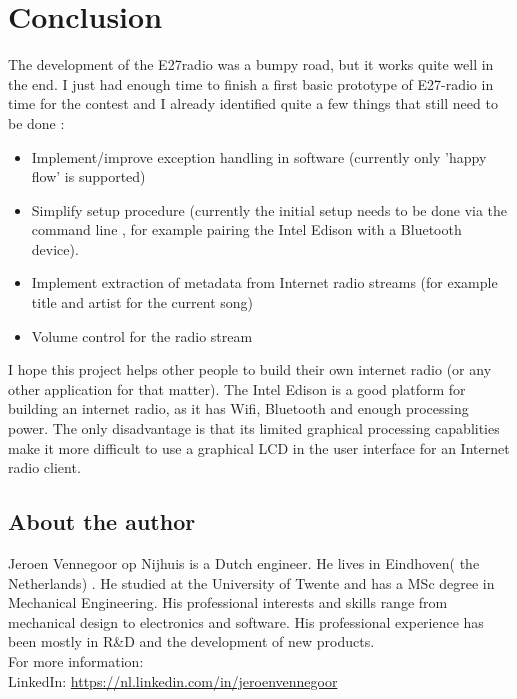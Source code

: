 \documentclass[12pt,a4paper]{scrreprt}
\begin{document}
\chapter{Conclusion}
The development of the E27radio was a bumpy road, but it works quite well in the end. I just had enough time to finish a first basic prototype of E27-radio in time for the contest and I already identified quite a few things that still need to be done :
\begin{itemize}
	\item Implement/improve exception handling in software 
	(currently only 'happy flow' is supported)
	\item Simplify setup procedure (currently the initial setup needs to be done via the command line , for example pairing the Intel Edison with a Bluetooth device).
	\item Implement extraction of metadata from Internet radio streams (for example title and artist for the current song)
	\item Volume control for the radio stream
\end{itemize}
I hope this project helps other people to build their own internet radio (or any other application for that matter). The Intel Edison is a good platform for building an internet radio, as it has Wifi, Bluetooth and enough processing power. The only disadvantage is that its limited graphical processing capablities make it more difficult to use a graphical LCD in the user interface for an Internet radio client.

\begin{appendices}

\chapter{About the author}
Jeroen Vennegoor op Nijhuis is a Dutch engineer. 
He lives in Eindhoven( the Netherlands) . He studied at the University of Twente and has a MSc degree in Mechanical Engineering. His professional interests and skills  range from mechanical design to electronics and software. His professional experience has been mostly in R\&D and the development of new products.\\
For more information:\\
LinkedIn: \url{https://nl.linkedin.com/in/jeroenvennegoor}

\end{appendices}
\end{document}
